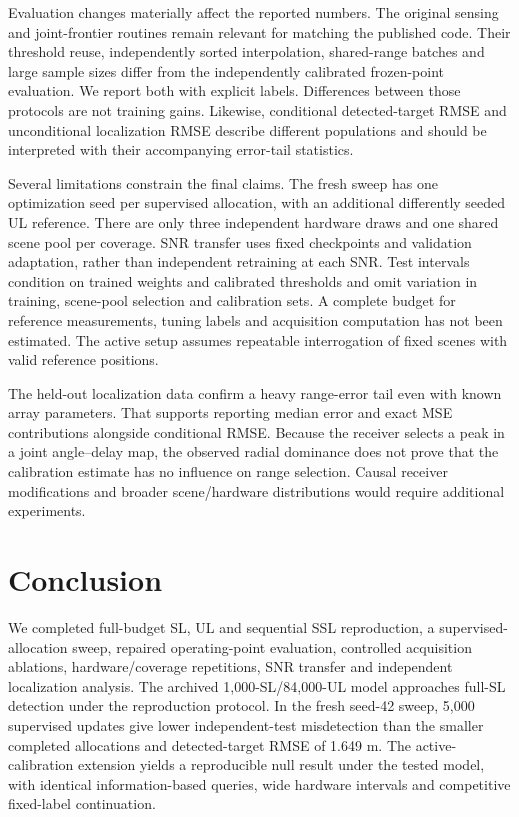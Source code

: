 \documentclass[conference]{IEEEtran}
\begin{document}
Evaluation changes materially affect the reported numbers. The original sensing and joint-frontier routines remain relevant for matching the published code. Their threshold reuse, independently sorted interpolation, shared-range batches and large sample sizes differ from the independently calibrated frozen-point evaluation. We report both with explicit labels. Differences between those protocols are not training gains. Likewise, conditional detected-target RMSE and unconditional localization RMSE describe different populations and should be interpreted with their accompanying error-tail statistics.

Several limitations constrain the final claims. The fresh sweep has one optimization seed per supervised allocation, with an additional differently seeded UL reference. There are only three independent hardware draws and one shared scene pool per coverage. SNR transfer uses fixed checkpoints and validation adaptation, rather than independent retraining at each SNR. Test intervals condition on trained weights and calibrated thresholds and omit variation in training, scene-pool selection and calibration sets. A complete budget for reference measurements, tuning labels and acquisition computation has not been estimated. The active setup assumes repeatable interrogation of fixed scenes with valid reference positions.

The held-out localization data confirm a heavy range-error tail even with known array parameters. That supports reporting median error and exact MSE contributions alongside conditional RMSE. Because the receiver selects a peak in a joint angle--delay map, the observed radial dominance does not prove that the calibration estimate has no influence on range selection. Causal receiver modifications and broader scene/hardware distributions would require additional experiments.

\section{Conclusion}
We completed full-budget SL, UL and sequential SSL reproduction, a supervised-allocation sweep, repaired operating-point evaluation, controlled acquisition ablations, hardware/coverage repetitions, SNR transfer and independent localization analysis. The archived 1,000-SL/84,000-UL model approaches full-SL detection under the reproduction protocol. In the fresh seed-42 sweep, 5,000 supervised updates give lower independent-test misdetection than the smaller completed allocations and detected-target RMSE of 1.649 m. The active-calibration extension yields a reproducible null result under the tested model, with identical information-based queries, wide hardware intervals and competitive fixed-label continuation.
\end{document}
